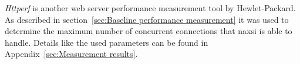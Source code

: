 \emph{Httperf} is another web server performance measurement tool by Hewlet-Packard. As described in section~\ref{sec:Baseline performance measurement} it was used to determine the maximum number of concurrent connections that naxsi is able to handle. Details like the used parameters can be found in Appendix~\ref{sec:Measurement results}.
